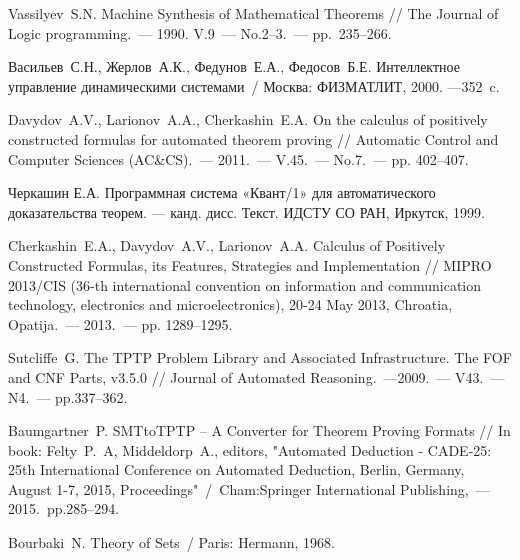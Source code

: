 \documentclass[a4paper]{jctart15b}
\begin{document}
\begin{thebibliography}{9}

 {\sc Vassilyev~S.N.}
Machine Synthesis of Mathematical Theorems // The Journal of Logic programming.~--- 1990. V.9~--- No.2--3.~--- pp.~235--266.

 {\sc Васильев~С.Н., Жерлов~А.К., Федунов~Е.А., Федосов~Б.Е.}
Интеллектное управление динамическими системами~/ Москва: ФИЗМАТЛИТ, 2000. ---352~c.

 {\sc Davydov~A.V., Larionov~A.A., Cherkashin~E.A.}
On the calculus of positively constructed formulas for automated theorem proving // Automatic Control and Computer Sciences (AC\&CS).~--- 2011.~--- V.45.~--- No.7.~--- pp. 402--407.

{\sc Черкашин Е.А.} Программная система «Квант/1» для автоматического доказательства теорем. --- канд. дисс. Текст. ИДСТУ СО РАН, Иркутск, 1999.

 {\sc Cherkashin~E.A., Davydov~A.V., Larionov~A.A.}
Calculus of Positively Constructed Formulas, its Features, Strategies and Implementation // MIPRO 2013/CIS (36-th international convention on information and communication technology, electronics and microelectronics), 20-24 May 2013, Chroatia, Opatija.~--- 2013.~--- pp. 1289--1295.

 {\sc Sutcliffe~G.}
The TPTP Problem Library and Associated Infrastructure. The FOF and CNF Parts, v3.5.0 // Journal of Automated Reasoning.~---2009.~--- V43.~--- N4.~--- pp.337--362.

 {\sc Baumgartner~P.}
SMTtoTPTP -- A Converter for Theorem Proving Formats // In book: Felty~P.~A, Middeldorp~A., editors, "Automated Deduction - CADE-25: 25th International Conference on Automated Deduction, Berlin, Germany, August 1-7, 2015, Proceedings"~/~Cham:Springer International Publishing,~---2015.~pp.285--294.

 {\sc Bourbaki~N.}
Theory of Sets~/ Paris: Hermann, 1968.

\end{thebibliography}
\end{document}
